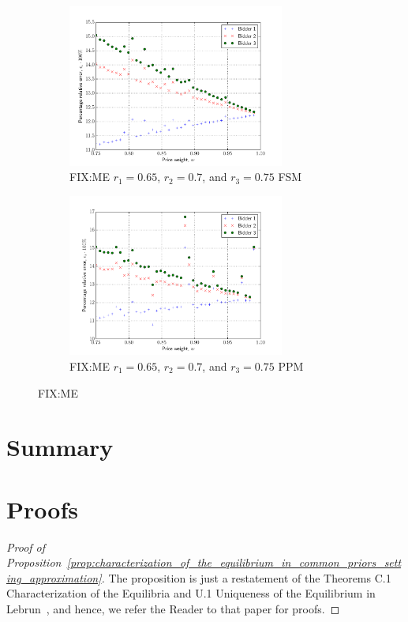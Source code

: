 \begin{figure}[p!]
  \setcounter{subfigure}{0}
  \begin{subfigure}[b]{0.5\textwidth}
    \includegraphics[width=2.8in]{Approximation/Figures/compare_3_bidders_065_070_075}
    \caption{FIX:ME $r_1=0.65$, $r_2=0.7$, and $r_3=0.75$ FSM}
    \label{fig:compare_3_bidders_065_070_075_fsm_approximation}
  \end{subfigure}
  \begin{subfigure}[b]{0.5\textwidth}
    \includegraphics[width=2.8in]{Approximation/Figures/compare_3_bidders_065_070_075_ppm}
    \caption{FIX:ME $r_1=0.65$, $r_2=0.7$, and $r_3=0.75$ PPM}
    \label{fig:compare_3_bidders_065_070_075_ppm_approximation}
  \end{subfigure}
  \caption{FIX:ME}
  \label{fig:compare_3_bidders_065_070_075_approximation}
\end{figure}


\section{Summary} %
\label{sec:summary_approximation}


\section{Proofs} %
\label{sec:proofs_approximation}
\begin{proof}[Proof of Proposition~\ref{prop:characterization_of_the_equilibrium_in_common_priors_setting_approximation}]
The proposition is just a restatement of the Theorems C.1 Characterization of the Equilibria and U.1 Uniqueness of the Equilibrium in Lebrun~\cite{Lebrun2006}, and hence, we refer the Reader to that paper for proofs.
\end{proof}
